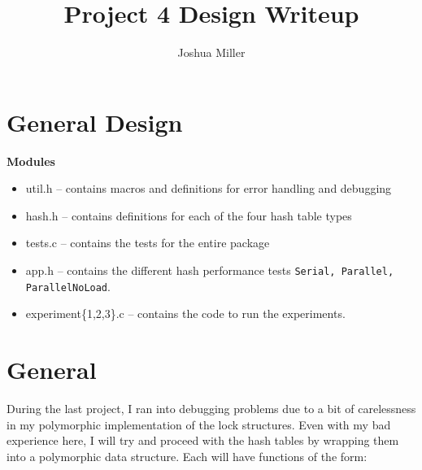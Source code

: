 

\title{Project 4 Design Writeup} 
\author{Joshua Miller}


\maketitle

\renewcommand{\t}[1]{{\tt\sc #1}}

\section{General Design}

{\bf Modules}
\begin{itemize}
\item util.h -- contains macros and definitions for error handling and debugging
\item hash.h -- contains definitions for each of the four hash table types 
\item tests.c -- contains the tests for the entire package
\item app.h -- contains the different hash performance tests
  \t{Serial, Parallel, ParallelNoLoad}.
\item experiment\{1,2,3\}.c -- contains the code to run the experiments.
\end{itemize}

\section{General}

During the last project, I ran into debugging problems due to a bit of
carelessness in my polymorphic implementation of the lock structures.
Even with my bad experience here, I will try and proceed with the hash
tables by wrapping them into a polymorphic data structure.  Each will
have functions of the form:

